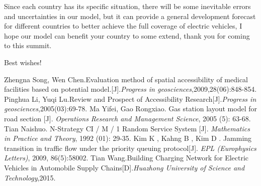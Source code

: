 \documentclass[12pt]{article}  %
\begin{document}
Since each country has its specific situation, there will be some inevitable errors and uncertainties in our model, but it can provide a general development forecast for different countries to better achieve the full coverage of electric vehicles, I hope our model can benefit your country to some extend, thank you for coming to this summit.

Best wishes!
\clearpage
\begin{thebibliography}{99}
Zhengna Song, Wen Chen.Evaluation method of spatial accessibility of medical facilities based on potential model.[J].\emph{Progress in geosciences},2009,28(06):848-854.
Pinghua Li, Yuqi Lu.Review and Prospect of Accessibility Research[J].\emph{Progress in geosciences},2005(03):69-78.
Ma Yifei, Gao Rongxiao. Gas station layout model for road section [J]. \emph{Operations Research and Management Science}, 2005 (5): 63-68.
Tian Naishuo. N-Strategy CI / M / 1 Random Service System [J]. \emph{Mathematics in Practice and Theory}, 1992 (01): 29-35.
Kim K , Kahng B , Kim D . Jamming transition in traffic flow under the priority queuing protocol[J]. \emph{EPL (Europhysics Letters)}, 2009, 86(5):58002.
Tian Wang.Building Charging Network for Electric Vehicles in Automobile Supply Chains[D].\emph{Huazhong University of Science and Technology},2015.
\end{thebibliography}
\end{document}
